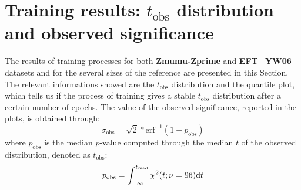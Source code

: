 \section{Training results: $t_\mathrm{obs}$ distribution and observed significance}
The results of training processes for both \textbf{Zmumu-Zprime} and \textbf{EFT\_YW06} datasets and for the several sizes of the reference are presented in this Section. The relevant informations showed are the $t_\mathrm{obs}$ distribution and the quantile plot, which tells us if the process of training gives a stable $t_\mathrm{obs}$ distribution after a certain number of epochs. The value of the observed significance, reported in the plots, is obtained through:
\begin{equation}
	\sigma_\mathrm{obs} = \sqrt{2} * \operatorname{erf^{-1}}(1-p_\mathrm{obs})
\end{equation}
where $p_\mathrm{obs}$ is the median $p$-value computed through the median $t$ of the observed distribution, denoted as $t_\mathrm{obs}$:
\begin{equation}
	p_\mathrm{obs} = \int_{-\infty}^{t_\mathrm{med}} \chi^2(t;\nu=96) \mathrm{d} t
\end{equation}


